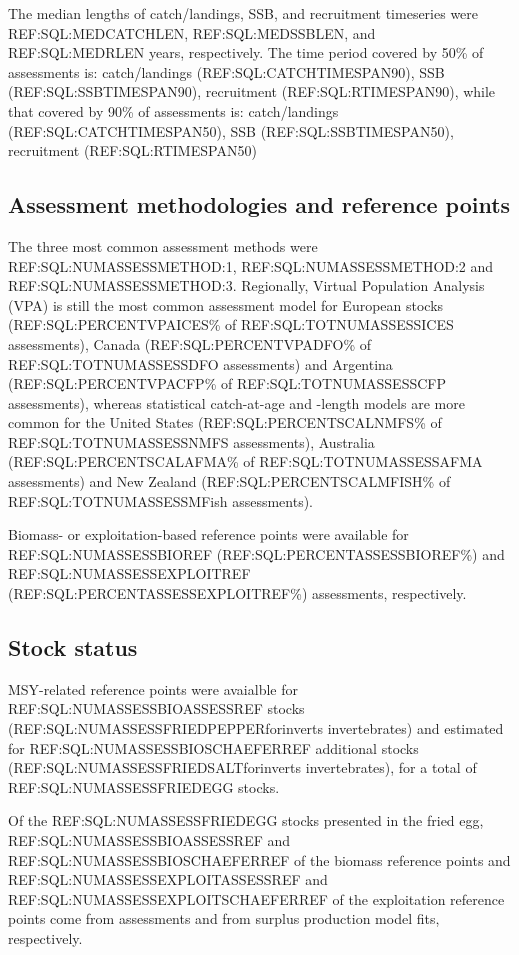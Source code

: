The median lengths of catch/landings, SSB, and recruitment timeseries
were REF:SQL:MEDCATCHLEN, REF:SQL:MEDSSBLEN, and REF:SQL:MEDRLEN
years, respectively.  The time period covered by 50\% of assessments
is: catch/landings (REF:SQL:CATCHTIMESPAN90), SSB
(REF:SQL:SSBTIMESPAN90), recruitment (REF:SQL:RTIMESPAN90), while that
covered by 90\% of assessments is: catch/landings
(REF:SQL:CATCHTIMESPAN50), SSB (REF:SQL:SSBTIMESPAN50), recruitment
(REF:SQL:RTIMESPAN50)
 
\subsection*{Assessment methodologies and reference points}
\noindent
The three most common assessment methods were
REF:SQL:NUMASSESSMETHOD:1, REF:SQL:NUMASSESSMETHOD:2 and
REF:SQL:NUMASSESSMETHOD:3. Regionally, Virtual Population Analysis
(VPA) is still the most common assessment model for European stocks
(REF:SQL:PERCENTVPAICES\% of REF:SQL:TOTNUMASSESSICES assessments),
Canada (REF:SQL:PERCENTVPADFO\% of REF:SQL:TOTNUMASSESSDFO
assessments) and Argentina (REF:SQL:PERCENTVPACFP\% of
REF:SQL:TOTNUMASSESSCFP assessments), whereas statistical catch-at-age
and -length models are more common for the United States
(REF:SQL:PERCENTSCALNMFS\% of REF:SQL:TOTNUMASSESSNMFS assessments),
Australia (REF:SQL:PERCENTSCALAFMA\% of REF:SQL:TOTNUMASSESSAFMA
assessments) and New Zealand (REF:SQL:PERCENTSCALMFISH\% of
REF:SQL:TOTNUMASSESSMFish assessments).

Biomass- or exploitation-based reference points were available for
REF:SQL:NUMASSESSBIOREF (REF:SQL:PERCENTASSESSBIOREF\%) and
REF:SQL:NUMASSESSEXPLOITREF (REF:SQL:PERCENTASSESSEXPLOITREF\%)
assessments, respectively.

\subsection*{Stock status}
\noindent

MSY-related reference points were avaialble for
REF:SQL:NUMASSESSBIOASSESSREF stocks
(REF:SQL:NUMASSESSFRIEDPEPPERforinverts invertebrates) and estimated
for REF:SQL:NUMASSESSBIOSCHAEFERREF additional stocks
(REF:SQL:NUMASSESSFRIEDSALTforinverts invertebrates), for a total of
REF:SQL:NUMASSESSFRIEDEGG stocks.

Of the
REF:SQL:NUMASSESSFRIEDEGG stocks presented in
the fried egg, REF:SQL:NUMASSESSBIOASSESSREF and
REF:SQL:NUMASSESSBIOSCHAEFERREF of the biomass reference points and
REF:SQL:NUMASSESSEXPLOITASSESSREF and
REF:SQL:NUMASSESSEXPLOITSCHAEFERREF of the exploitation reference
points come from assessments and from surplus production model fits,
respectively.

